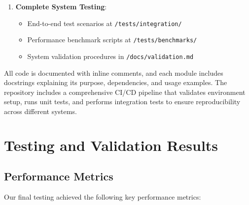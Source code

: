 \documentclass[12pt]{article}
\begin{document}
\begin{enumerate}
    \item \textbf{Complete System Testing}:
    \begin{itemize}
        \item End-to-end test scenarios at \texttt{/tests/integration/}
        \item Performance benchmark scripts at \texttt{/tests/benchmarks/}
        \item System validation procedures in \texttt{/docs/validation.md}
    \end{itemize}
\end{enumerate}

All code is documented with inline comments, and each module includes docstrings explaining its purpose, dependencies, and usage examples. The repository includes a comprehensive CI/CD pipeline that validates environment setup, runs unit tests, and performs integration tests to ensure reproducibility across different systems.

\section{Testing and Validation Results}

\subsection{Performance Metrics}

Our final testing achieved the following key performance metrics:
\end{document}
